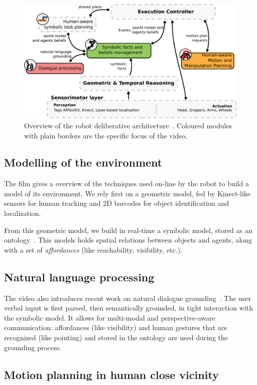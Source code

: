 \documentclass[conference]{IEEEtran}
\begin{document}
\begin{figure}[h!]
        \centering
        \includegraphics[width=0.9\columnwidth]{archi}
        \caption{Overview of the robot deliberative
        architecture~\cite{Alami2011a}. Coloured modules with plain borders are
        the specific focus of the video.}
        \label{fig|archi}
\end{figure}

\subsection{Modelling of the environment}

The film gives a overview of the techniques used on-line by the robot
to build a model of its environment. We rely first on a geometric model, fed by
Kinect-like sensors for human tracking and 2D barcodes for object identification
and localization.

From this geometric model, we build in real-time a symbolic model, stored as an
ontology~\cite{Lemaignan2010}. This models holds spatial relations between
objects and agents, along with a set of \emph{affordances} (like reachability,
visibility, etc.).

\subsection{Natural language processing}

The video also introduces recent work on natural dialogue
grounding~\cite{Lemaignan2011a}. The user verbal input is first parsed, then
semantically grounded, in tight interaction with the symbolic model. It allows
for multi-modal and perspective-aware communication: affordances (like
visibility) and human gestures that are recognized (like pointing) and stored
in the ontology are used during the grounding process.

\subsection{Motion planning in human close vicinity}
\end{document}
